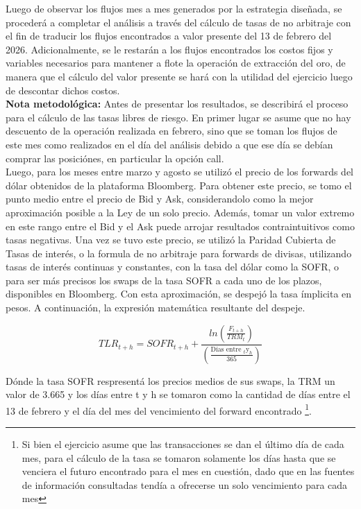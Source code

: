 \documentclass{article}
\theoremstyle{remark}
\theoremstyle{definition}
\begin{document}
 Luego de observar los flujos mes a mes generados por la estrategia diseñada, se procederá a completar el análisis a través del cálculo de tasas de no arbitraje con el fin de traducir los flujos encontrados a valor presente del 13 de febrero del 2026. Adicionalmente, se le restarán a los flujos encontrados los costos fijos y variables necesarios para mantener a flote la operación de extracción del oro, de manera que el cálculo del valor presente se hará con la utilidad del ejercicio luego de descontar dichos costos.\\

 \textbf{Nota metodológica:} Antes de presentar los resultados, se describirá el proceso para el cálculo de las tasas libres de riesgo. En primer lugar se asume que no hay descuento de la operación realizada en febrero, sino que se toman los flujos de este mes como realizados en el día del análisis debido a que ese día se debían comprar las posiciónes, en particular la opción call.\\
 
 Luego, para los meses entre marzo y agosto se utilizó el precio de los forwards del dólar obtenidos de la plataforma Bloomberg. Para obtener este precio, se tomo el punto medio entre el precio de Bid y Ask, considerandolo como la mejor aproximación posible a la Ley de un solo precio. Además, tomar un valor extremo en este rango entre el Bid y el Ask puede arrojar resultados contraintuitivos como tasas negativas. Una vez se tuvo este precio, se utilizó la Paridad Cubierta de Tasas de interés, o la formula de no arbitraje para forwards de divisas, utilizando tasas de interés continuas y constantes, con la tasa del dólar como la SOFR, o para ser más precisos los swaps de la tasa SOFR a cada uno de los plazos, disponibles en Bloomberg. Con esta aproximación, se despejó la tasa ímplicita en pesos. A continuación, la expresión matemática resultante del despeje.

\[
TLR_{t+h} = SOFR_{t+h} + \frac{ln\left(\frac{F_{t+h}}{TRM_t}\right)}{\left(\frac{\text{Días entre }_t\text{y}_h}{365}\right)}
\]

Dónde la tasa SOFR respresentá los precios medios de sus swaps, la TRM un valor de 3.665 y los días entre t y h se tomaron como la cantidad de días entre el 13 de febrero y el día del mes del vencimiento del forward encontrado \footnote{Si bien el ejercicio asume que las transacciones se dan el último día de cada mes, para el cálculo de la tasa se tomaron solamente los días hasta que se venciera el futuro encontrado para el mes en cuestión, dado que en las fuentes de información consultadas tendía a ofrecerse un solo vencimiento para cada mes}.\\
\end{document}

